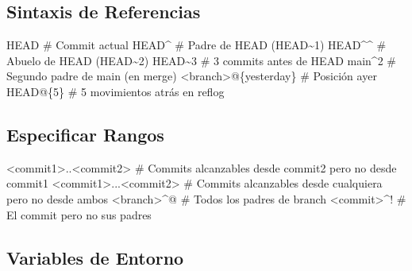 \documentclass[
  doc,
  floatsintext,
  longtable,
  a4paper,
  nolmodern,
  notxfonts,
  notimes,
  12pt,
  colorlinks=true,linkcolor=blue,citecolor=blue,urlcolor=blue]{apa7}
\newenvironment{Shaded}{\begin{snugshade}}{\end{snugshade}}
\newcommand{\CommentTok}[1]{\textcolor[rgb]{0.37,0.37,0.37}{#1}}
\newcommand{\ExtensionTok}[1]{\textcolor[rgb]{0.00,0.23,0.31}{#1}}
\newcommand{\NormalTok}[1]{\textcolor[rgb]{0.00,0.23,0.31}{#1}}
\newcommand{\OperatorTok}[1]{\textcolor[rgb]{0.37,0.37,0.37}{#1}}
\begin{document}
\subsection{Sintaxis de Referencias}\label{sintaxis-de-referencias}

\begin{Shaded}
\begin{Highlighting}[]
\ExtensionTok{HEAD}                  \CommentTok{\# Commit actual}
\ExtensionTok{HEAD\^{}}                 \CommentTok{\# Padre de HEAD (HEAD\textasciitilde{}1)}
\ExtensionTok{HEAD\^{}\^{}}                \CommentTok{\# Abuelo de HEAD (HEAD\textasciitilde{}2)}
\ExtensionTok{HEAD\textasciitilde{}3}                \CommentTok{\# 3 commits antes de HEAD}
\ExtensionTok{main\^{}2}                \CommentTok{\# Segundo padre de main (en merge)}
\OperatorTok{\textless{}}\NormalTok{branch}\OperatorTok{\textgreater{}}\NormalTok{@\{yesterday\}  }\CommentTok{\# Posición ayer}
\ExtensionTok{HEAD@\{5\}}              \CommentTok{\# 5 movimientos atrás en reflog}
\end{Highlighting}
\end{Shaded}

\subsection{Especificar Rangos}\label{especificar-rangos}

\begin{Shaded}
\begin{Highlighting}[]
\OperatorTok{\textless{}}\NormalTok{commit1}\OperatorTok{\textgreater{}}\NormalTok{..}\OperatorTok{\textless{}}\NormalTok{commit2}\OperatorTok{\textgreater{}}   \CommentTok{\# Commits alcanzables desde commit2 pero no desde commit1}
\OperatorTok{\textless{}}\NormalTok{commit1}\OperatorTok{\textgreater{}}\NormalTok{...}\OperatorTok{\textless{}}\NormalTok{commit2}\OperatorTok{\textgreater{}}  \CommentTok{\# Commits alcanzables desde cualquiera pero no desde ambos}
\OperatorTok{\textless{}}\NormalTok{branch}\OperatorTok{\textgreater{}}\NormalTok{\^{}@             }\CommentTok{\# Todos los padres de branch}
\OperatorTok{\textless{}}\NormalTok{commit}\OperatorTok{\textgreater{}}\NormalTok{\^{}!             }\CommentTok{\# El commit pero no sus padres}
\end{Highlighting}
\end{Shaded}

\subsection{Variables de Entorno}\label{variables-de-entorno}
\end{document}

